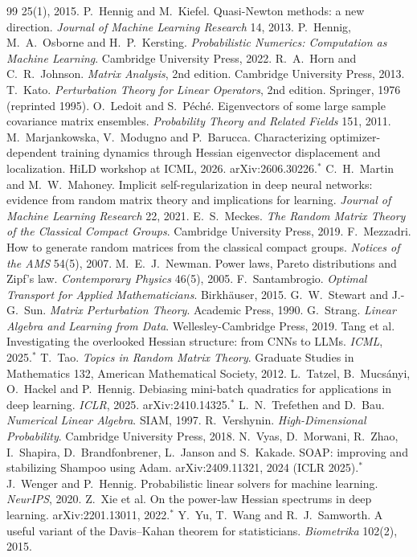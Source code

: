 \documentclass[11pt,a4paper]{article}
\theoremstyle{plain}
\theoremstyle{definition}
\theoremstyle{remark}
\begin{document}
\begin{thebibliography}{99}
  25(1), 2015.
 P.~Hennig and M.~Kiefel. Quasi-Newton methods: a new direction. \emph{Journal of Machine
  Learning Research} 14, 2013.
 P.~Hennig, M.~A.~Osborne and H.~P.~Kersting. \emph{Probabilistic Numerics: Computation as Machine
  Learning}. Cambridge University Press, 2022.
 R.~A.~Horn and C.~R.~Johnson. \emph{Matrix Analysis}, 2nd edition. Cambridge University Press, 2013.
 T.~Kato. \emph{Perturbation Theory for Linear Operators}, 2nd edition. Springer, 1976 (reprinted
  1995).
 O.~Ledoit and S.~P\'ech\'e. Eigenvectors of some large sample covariance matrix ensembles.
  \emph{Probability Theory and Related Fields} 151, 2011.
 M.~Marjankowska, V.~Modugno and P.~Barucca. Characterizing optimizer-dependent training
  dynamics through Hessian eigenvector displacement and localization. HiLD workshop at ICML, 2026.
  arXiv:2606.30226.$^*$
 C.~H.~Martin and M.~W.~Mahoney. Implicit self-regularization in deep neural networks: evidence from
  random matrix theory and implications for learning. \emph{Journal of Machine Learning Research} 22, 2021.
 E.~S.~Meckes. \emph{The Random Matrix Theory of the Classical Compact Groups}. Cambridge University
  Press, 2019.
 F.~Mezzadri. How to generate random matrices from the classical compact groups. \emph{Notices of
  the AMS} 54(5), 2007.
 M.~E.~J.~Newman. Power laws, Pareto distributions and Zipf's law. \emph{Contemporary Physics} 46(5),
  2005.
 F.~Santambrogio. \emph{Optimal Transport for Applied Mathematicians}. Birkh\"auser, 2015.
 G.~W.~Stewart and J.-G.~Sun. \emph{Matrix Perturbation Theory}. Academic Press, 1990.
 G.~Strang. \emph{Linear Algebra and Learning from Data}. Wellesley-Cambridge Press, 2019.
 Tang et al. Investigating the overlooked Hessian structure: from CNNs to LLMs. \emph{ICML}, 2025.$^*$
 T.~Tao. \emph{Topics in Random Matrix Theory}. Graduate Studies in Mathematics 132, American
  Mathematical Society, 2012.
 L.~Tatzel, B.~Mucs\'anyi, O.~Hackel and P.~Hennig. Debiasing mini-batch quadratics for applications
  in deep learning. \emph{ICLR}, 2025. arXiv:2410.14325.$^*$
 L.~N.~Trefethen and D.~Bau. \emph{Numerical Linear Algebra}. SIAM, 1997.
 R.~Vershynin. \emph{High-Dimensional Probability}. Cambridge University Press, 2018.
 N.~Vyas, D.~Morwani, R.~Zhao, I.~Shapira, D.~Brandfonbrener, L.~Janson and S.~Kakade. SOAP: improving
  and stabilizing Shampoo using Adam. arXiv:2409.11321, 2024 (ICLR 2025).$^*$
 J.~Wenger and P.~Hennig. Probabilistic linear solvers for machine learning. \emph{NeurIPS}, 2020.
 Z.~Xie et al. On the power-law Hessian spectrums in deep learning. arXiv:2201.13011, 2022.$^*$
 Y.~Yu, T.~Wang and R.~J.~Samworth. A useful variant of the Davis--Kahan theorem for statisticians.
  \emph{Biometrika} 102(2), 2015.
\end{thebibliography}
\end{document}
